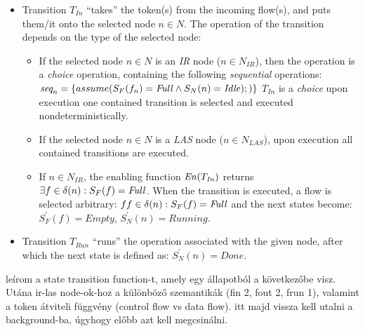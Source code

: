 \begin{definition}
	
\begin{itemize}
	\item Transition \( T_\mathit{In} \) \enquote{takes} the token(s) from the incoming flow(s), and puts them/it onto the selected node \(n \in N\). The operation of the transition depends on the type of the selected node:
	\begin{itemize}
		\item If the selected node \(n \in N\) is an \emph{IR} node (\(n \in N_\mathit{IR}\)), then the operation is a \emph{choice} operation, containing the following \emph{sequential} operations: \( \emph{seq}_n = \{ assume(S_F(f_n) = \mathit{Full} \wedge S_N(n) = \mathit{Idle});  ) \} \) \( T_\mathit{In} \) is a \emph{choice} upon execution one contained transition is selected and executed nondeterministically.
		\item If the selected node \(n \in N\) is a \emph{LAS} node (\(n \in N_\mathit{LAS}\)), upon execution all contained transitions are executed.
		\item If \(n \in N_\mathit{IR} \), the enabling function \( \mathit{En}(T_\mathit{In}) \) returns \( \exists f \in \delta(n) : S_F(f) = \mathit{Full} \). When the transition is executed, a flow is selected arbitrary: \(f f \in \delta(n) : S_F(f) = \mathit{Full} \) and the next states become: \( S_F^\prime(f) = \mathit{Empty} \), \( S_N^\prime(n) = \mathit{Running} \).
	\end{itemize}
	\item Transition \( T_\mathit{Run} \) \enquote{runs} the operation associated with the given node, after which the next state is defined as: \(S_N^\prime(n) = \mathit{Done}\). 
\end{itemize}

leírom a state transition function-t, amely egy állapotból a következőbe visz. Utána ir-las node-ok-hoz a különböző szemantikák (fin 2, fout 2, frun 1), valamint a token átviteli függvény (control flow vs data flow). itt majd vissza kell utalni a background-ba, úgyhogy előbb azt kell megcsinálni.


\end{definition}
